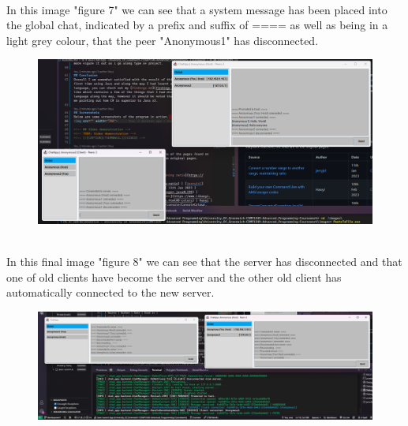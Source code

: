 \documentclass{COMPXXXX}
\begin{document}
{\begin{figure}
\caption{}
\label{fig:figure06}
\end{figure}\\
In this image "figure 7" we can see that a system message has been placed into the global chat, indicated by a prefix and suffix of ==== as well as being in a light grey colour, that the peer "Anonymous1" has disconnected.\\
\begin{figure}
\centering
\includegraphics[width=1.0\linewidth]{client_disconnect 4.png}
\caption{}
\label{fig:figure07}
\end{figure}\\
In this final image "figure 8" we can see that the server has disconnected and that one of old clients have become the server and the other old client has automatically connected to the new server.\\
\begin{figure}
\centering
\includegraphics[width=1.0\linewidth]{server_disconnect 5.png}
\caption{}
\label{fig:figure08}
\end{figure}}
\end{document}
